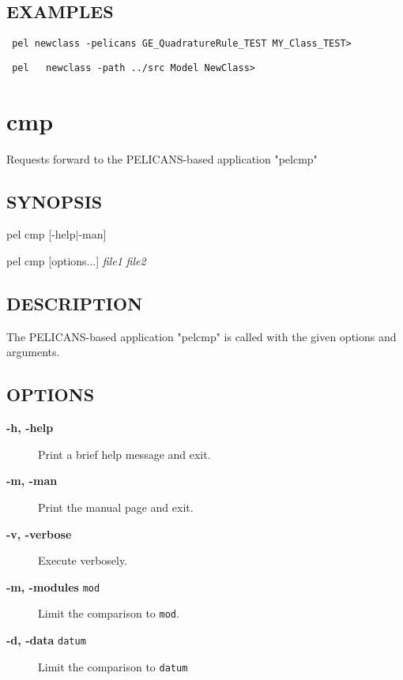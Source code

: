 \documentclass{article}
\begin{document}
\subsection*{EXAMPLES\label{newclass_EXAMPLES}}
\begin{verbatim}
 pel newclass -pelicans GE_QuadratureRule_TEST MY_Class_TEST>
\end{verbatim}
\begin{verbatim}
 pel   newclass -path ../src Model NewClass>
\end{verbatim}
\clearpage
\section{cmp\label{cmp}}


Requests forward to the PELICANS-based application "pelcmp"

\subsection*{SYNOPSIS\label{cmp_SYNOPSIS}}


pel cmp [-help$|$-man]



pel cmp [options...] \emph{file1} \emph{file2}

\subsection*{DESCRIPTION\label{cmp_DESCRIPTION}}


The PELICANS-based application "pelcmp" is called with the given
options and arguments.

\subsection*{OPTIONS\label{cmp_OPTIONS}}
\begin{description}

\item[\textbf{-h, -help}] \mbox{}

Print a brief help message and exit.


\item[\textbf{-m, -man}] \mbox{}

Print the manual page and exit.


\item[\textbf{-v, -verbose}] \mbox{}

Execute verbosely.


\item[\textbf{-m, -modules} \texttt{mod}] \mbox{}

Limit the comparison to \texttt{mod}.


\item[\textbf{-d, -data} \texttt{datum}] \mbox{}

Limit the comparison to \texttt{datum}

\end{description}
\end{document}
